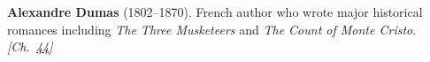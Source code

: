 \textbf{Alexandre Dumas} (1802–1870). French author who wrote major historical romances including \emph{The Three Musketeers} and \emph{The Count of Monte Cristo}. \emph{[Ch.~\hyperref[ch:ironmask]{44}]}

